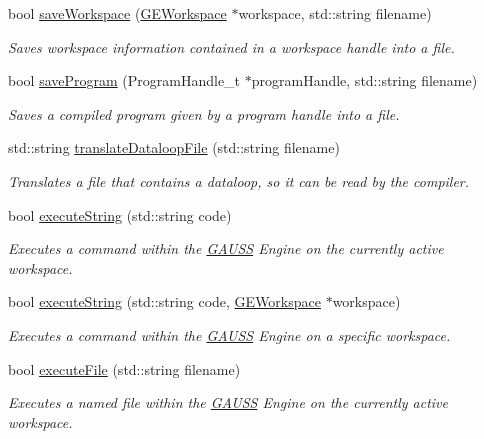 \begin{DoxyCompactItemize}
bool \hyperlink{class_g_a_u_s_s_a7bca1d6810ef2a67a53bacc1ddb9a8c0}{save\+Workspace} (\hyperlink{class_g_e_workspace}{G\+E\+Workspace} $\ast$workspace, std\+::string filename)
\begin{DoxyCompactList}\small\item\em Saves workspace information contained in a workspace handle into a file. \end{DoxyCompactList}\item 
bool \hyperlink{class_g_a_u_s_s_a65b726ddf768f24b4c9bdbec4bc668a4}{save\+Program} (Program\+Handle\+\_\+t $\ast$program\+Handle, std\+::string filename)
\begin{DoxyCompactList}\small\item\em Saves a compiled program given by a program handle into a file. \end{DoxyCompactList}\item 
std\+::string \hyperlink{class_g_a_u_s_s_aba7db184b734820e056d37d6880a65a7}{translate\+Dataloop\+File} (std\+::string filename)
\begin{DoxyCompactList}\small\item\em Translates a file that contains a dataloop, so it can be read by the compiler. \end{DoxyCompactList}\item 
bool \hyperlink{class_g_a_u_s_s_a3680b0addd695d8a5690a1e2d3fc0d8b}{execute\+String} (std\+::string code)
\begin{DoxyCompactList}\small\item\em Executes a command within the \hyperlink{class_g_a_u_s_s}{G\+A\+U\+SS} Engine on the currently active workspace. \end{DoxyCompactList}\item 
bool \hyperlink{class_g_a_u_s_s_add35ed82380ee718cb2638350956ee9c}{execute\+String} (std\+::string code, \hyperlink{class_g_e_workspace}{G\+E\+Workspace} $\ast$workspace)
\begin{DoxyCompactList}\small\item\em Executes a command within the \hyperlink{class_g_a_u_s_s}{G\+A\+U\+SS} Engine on a specific workspace. \end{DoxyCompactList}\item 
bool \hyperlink{class_g_a_u_s_s_a949037ab9f5c49d94a0c7962dac0548d}{execute\+File} (std\+::string filename)
\begin{DoxyCompactList}\small\item\em Executes a named file within the \hyperlink{class_g_a_u_s_s}{G\+A\+U\+SS} Engine on the currently active workspace. \end{DoxyCompactList}\item 

\end{DoxyCompactItemize}
